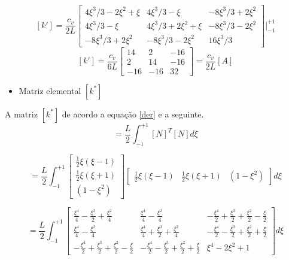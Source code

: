 \documentclass{article} %
\begin{document}
\begin{equation*}\label{}
[k']= \frac{c_v}{2L}\begin{bmatrix}
4\xi^3/3-2\xi^2+\xi&4\xi^3/3-\xi&-8\xi^3/3+2\xi^2\\
4\xi^3/3-\xi&4\xi^3/3+2\xi^2+\xi&-8\xi^3/3-2\xi^2\\
-8\xi^3/3+2\xi^2&-8\xi^3/3-2\xi^2&16\xi^3/3
\end{bmatrix}\biggr|_{-1}^{+1}
\end{equation*}
\begin{equation}\label{}
[k']= \frac{c_v}{6L}\begin{bmatrix}
14 &2&-16 \\
2&14&-16\\
-16&-16&32
\end{bmatrix}=\frac{c_v}{2L}[A]
\end{equation}

\begin{itemize}
	\item Matriz elemental \([k^*]\)	
\end{itemize}


A matriz \([k^*]\) de acordo a equação \ref{der} e a seguinte.
\begin{equation*}
[k^*]=\frac{L}{2}\int_{-1}^{+1}[N]^T[N]d\xi
\end{equation*}

\begin{equation*}
[k^*]=\frac{L}{2}\int_{-1}^{+1}\begin{bmatrix}
\frac{1}{2}\xi(\xi-1)\\\frac{1}{2}\xi(\xi+1)\\(1-\xi^2)
\end{bmatrix}\begin{bmatrix}
\frac{1}{2}\xi(\xi-1)&\frac{1}{2}\xi(\xi+1)&(1-\xi^2)
\end{bmatrix}d\xi
\end{equation*}

\begin{equation*}
[k^*]=\frac{L}{2}\int_{-1}^{+1}\begin{bmatrix}
\frac{\xi^4}{4}-\frac{\xi^3}{2}+\frac{\xi^2}{4}&\frac{\xi^4}{4}-\frac{\xi^2}{4}&-\frac{\xi^4}{2}+\frac{\xi^3}{2}+\frac{\xi^2}{2}-\frac{\xi}{2}\\
\frac{\xi^4}{4}-\frac{\xi^2}{4}&\frac{\xi^4}{4}+\frac{\xi^3}{2}+\frac{\xi^2}{4}&-\frac{\xi^4}{2}-\frac{\xi^3}{2}+\frac{\xi^2}{2}+\frac{\xi}{2}\\
-\frac{\xi^4}{2}+\frac{\xi^3}{2}+\frac{\xi^2}{2}-\frac{\xi}{2}&-\frac{\xi^4}{2}-\frac{\xi^3}{2}+\frac{\xi^2}{2}+\frac{\xi}{2}&\xi^4-2\xi^2+1
\end{bmatrix}d\xi
\end{equation*}
\end{document}
